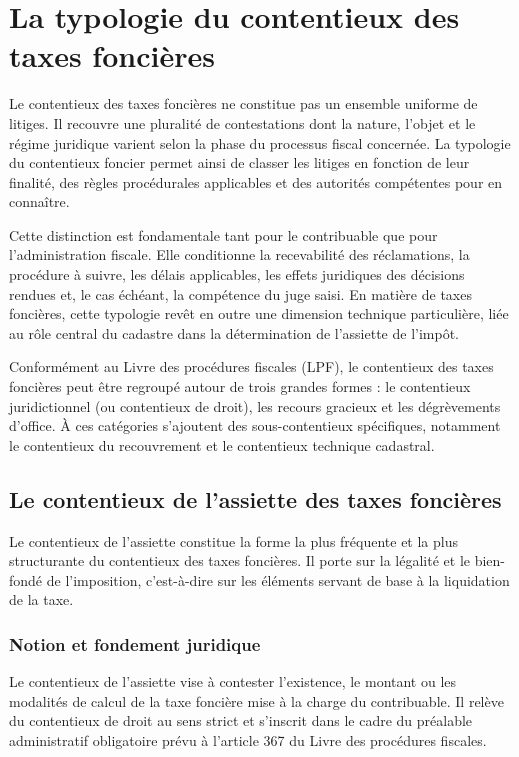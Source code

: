 \documentclass[Cours_contentieuxTF2026.tex]{subfiles}
\begin{document}
\chapter{La typologie du contentieux des taxes foncières}

Le contentieux des taxes foncières ne constitue pas un ensemble uniforme de litiges.
Il recouvre une pluralité de contestations dont la nature, l’objet et le régime
juridique varient selon la phase du processus fiscal concernée. La typologie du
contentieux foncier permet ainsi de classer les litiges en fonction de leur finalité,
des règles procédurales applicables et des autorités compétentes pour en connaître.

Cette distinction est fondamentale tant pour le contribuable que pour
l’administration fiscale. Elle conditionne la recevabilité des réclamations, la
procédure à suivre, les délais applicables, les effets juridiques des décisions rendues
et, le cas échéant, la compétence du juge saisi. En matière de taxes foncières, cette
typologie revêt en outre une dimension technique particulière, liée au rôle central
du cadastre dans la détermination de l’assiette de l’impôt.

Conformément au Livre des procédures fiscales (LPF), le contentieux des taxes
foncières peut être regroupé autour de trois grandes formes : le contentieux
juridictionnel (ou contentieux de droit), les recours gracieux et les dégrèvements
d’office. À ces catégories s’ajoutent des sous-contentieux spécifiques, notamment le
contentieux du recouvrement et le contentieux technique cadastral.

\section{Le contentieux de l’assiette des taxes foncières}

Le contentieux de l’assiette constitue la forme la plus fréquente et la plus structurante
du contentieux des taxes foncières. Il porte sur la légalité et le bien-fondé de
l’imposition, c’est-à-dire sur les éléments servant de base à la liquidation de la taxe.

\subsection{Notion et fondement juridique}

Le contentieux de l’assiette vise à contester l’existence, le montant ou les modalités
de calcul de la taxe foncière mise à la charge du contribuable. Il relève du contentieux
de droit au sens strict et s’inscrit dans le cadre du préalable administratif obligatoire
prévu à l’article 367 du Livre des procédures fiscales.
\end{document}
